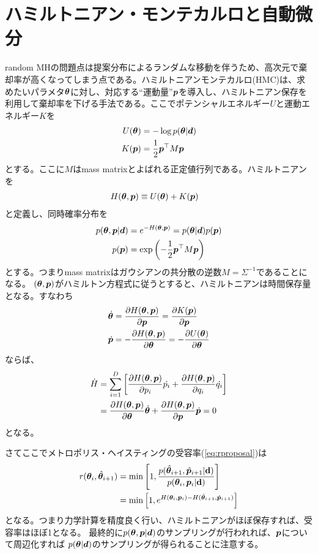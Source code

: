 \section{ハミルトニアン・モンテカルロと自動微分}

random MHの問題点は提案分布によるランダムな移動を伴うため、高次元で棄却率が高くなってしまう点である。ハミルトニアンモンテカルロ(HMC)は、求めたいパラメタ$\boldsymbol{\theta}$に対し、対応する``運動量''$\boldsymbol{p}$を導入し、ハミルトニアン保存を利用して棄却率を下げる手法である。ここでポテンシャルエネルギー$U$と運動エネルギー$K$を
\begin{align}
    U(\boldsymbol{\theta}) &= - \log{p({\boldsymbol{\theta}}|\boldsymbol{d})} \\
    K(\boldsymbol{p}) &= \frac{1}{2} \boldsymbol{p}^\top M \boldsymbol{p}
\end{align}
とする。ここに$M$はmass matrixとよばれる正定値行列である。ハミルトニアンを
\begin{align}
    H(\boldsymbol{\theta}, \boldsymbol{p}) &\equiv U(\boldsymbol{\theta}) + K(\boldsymbol{p})
\end{align}
と定義し、同時確率分布を
\begin{align}
    p({\boldsymbol{\theta}}, \boldsymbol{p}|\boldsymbol{d}) &= e^{-H(\boldsymbol{\theta}, \boldsymbol{p})} = p({\boldsymbol{\theta}}|\boldsymbol{d}) p(\boldsymbol{p}) \\
    p(\boldsymbol{p}) &= \exp{\left( -\frac{1}{2} \boldsymbol{p}^\top M \boldsymbol{p}\right)}
\end{align}
とする。つまりmass matrixはガウシアンの共分散の逆数$M = \Sigma^{-1}$であることになる。
$(\boldsymbol{\theta}, \boldsymbol{p})$がハミルトン方程式に従うとすると、ハミルトニアンは時間保存量となる。すなわち
\begin{align}
    \dot{\boldsymbol{\theta}} &= \frac{\partial H(\boldsymbol{\theta}, \boldsymbol{p})}{\partial \boldsymbol{p}} = \frac{\partial K(\boldsymbol{p})}{\partial \boldsymbol{p}} \\
     \dot{\boldsymbol{p}} &= - \frac{\partial H(\boldsymbol{\theta}, \boldsymbol{p})}{\partial \boldsymbol{\theta}} = - \frac{\partial U(\boldsymbol{\theta})}{\partial \boldsymbol{\theta}}
\end{align}
ならば、
\begin{align}
 \dot{H} &= \sum_{i=1}^D \left[\frac{\partial H(\boldsymbol{\theta}, \boldsymbol{p})}{\partial p_i} \dot{p_i} + \frac{\partial H(\boldsymbol{\theta}, \boldsymbol{p})}{\partial q_i} \dot{q_i} \right] \\
 &= \frac{\partial H(\boldsymbol{\theta}, \boldsymbol{p})}{\partial \boldsymbol{\theta}} \dot{\boldsymbol{\theta}} + \frac{\partial H(\boldsymbol{\theta}, \boldsymbol{p})}{\partial \boldsymbol{p}} \dot{\boldsymbol{p}} = 0
\end{align}
となる。

さてここでメトロポリス・ヘイスティングの受容率(\ref{eq:rproposal})は
\begin{align}
r({\boldsymbol{\theta}}_i,\hat{\boldsymbol{\theta}}_{i+1}) &= \mathrm{min} \left[1, \frac{p(\hat{\boldsymbol{\theta}}_{i+1},\hat{\boldsymbol{p}}_{i+1}|{\bf d}) }{p({\boldsymbol{\theta}}_{i},{\boldsymbol{p}}_{i}|{\bf d}) } \right] \\
 &= \mathrm{min} \left[1, e^{H({\boldsymbol{\theta}}_{i},{\boldsymbol{p}}_{i}) - H(\hat{\boldsymbol{\theta}}_{i+1},\hat{\boldsymbol{p}}_{i+1})}  \right]
\end{align}
となる。つまり力学計算を精度良く行い、ハミルトニアンがほぼ保存すれば、受容率はほぼ1となる。
最終的に$p(\boldsymbol{\theta}, \boldsymbol{p}|\boldsymbol{d})$のサンプリングが行われれば、$\boldsymbol{p}$について周辺化すれば $p(\boldsymbol{\theta}|\boldsymbol{d})$のサンプリングが得られることに注意する。

